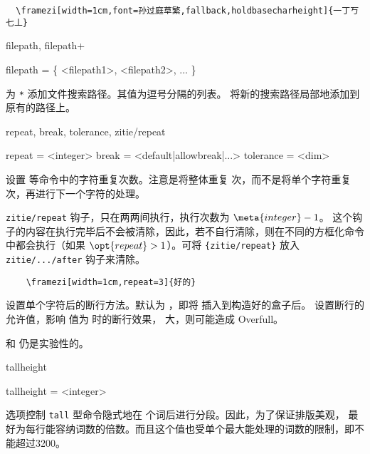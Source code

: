 \documentclass{ctxdoc}
\begin{document}
\begin{verbatim}
  \framezi[width=1cm,font=孙过庭草繁,fallback,holdbasecharheight]{一丁丂七丄}
\end{verbatim}

\begin{function}{
  filepath,
  filepath+
}
  \begin{syntax}
    filepath = \{ <filepath1>, <filepath2>, ... \}
  \end{syntax}
   为 \verb|*| 添加文件搜索路径。其值为逗号分隔的列表。
   将新的搜索路径局部地添加到原有的路径上。
\end{function}

\begin{function}{
  repeat,
  break,
  tolerance,
  zitie/repeat
}
  \begin{syntax}
    repeat = <integer> 
    break  = <default|allowbreak|...> 
    tolerance = <dim> \init{1em}
  \end{syntax}
  设置  等命令中的字符重复次数。注意是将整体重复  次，而不是将单个字符重复  次，再进行下一个字符的处理。

  \verb|zitie/repeat| 钩子，只在两两间执行，执行次数为 $\meta{integer}-1$。
  这个钩子的内容在执行完毕后不会被清除，因此，若不自行清除，则在不同的方框化命令中都会执行（如果 $\opt{repeat}>1$）。可将 \verb|{zitie/repeat}| 放入 \verb|zitie/.../after| 钩子来清除。

  \begin{verbatim}
    \framezi[width=1cm,repeat=3]{好的}
  \end{verbatim}

   设置单个字符后的断行方法。默认为 ，即将  插入到构造好的盒子后。
   设置断行的允许值，影响  值为  时的断行效果， 大，则可能造成 Overfull。

   和  仍是实验性的。
\end{function}

\begin{function}{tallheight}
  \begin{syntax}
    tallheight = <integer> 
  \end{syntax}
   选项控制 \verb|tall| 型命令隐式地在  个词后进行分段。因此，为了保证排版美观， 最好为每行能容纳词数的倍数。而且这个值也受单个最大能处理的词数的限制，即不能超过3200。
\end{function}
\end{document}
